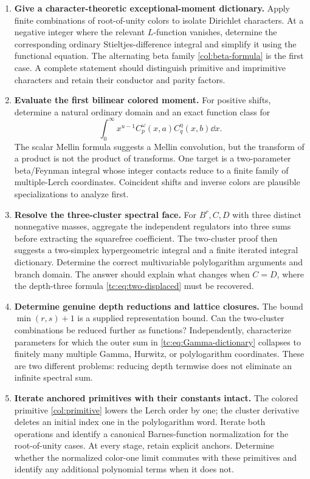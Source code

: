 \begin{enumerate}[label=\textbf{Q\arabic*.},leftmargin=*]
\item \textbf{Give a character-theoretic exceptional-moment dictionary.}
Apply finite combinations of root-of-unity colors to isolate
Dirichlet characters. At a negative integer where the relevant
$L$-function vanishes, determine the corresponding ordinary
Stieltjes-difference integral and simplify it using the
functional equation. The alternating beta family
\eqref{col:beta-formula} is the first case. A complete statement
should distinguish primitive and imprimitive characters and
retain their conductor and parity factors.

\item \textbf{Evaluate the first bilinear colored moment.}
For positive shifts, determine a natural ordinary domain and an
exact function class for
\[
 \int_0^\infty x^{u-1}
                  C_p^\omega(x,a)C_q^\eta(x,b)\dd x.
\]
The scalar Mellin formula suggests a Mellin convolution, but
the transform of a product is not the product of transforms.
One target is a two-parameter beta/Feynman integral whose
integer contacts reduce to a finite family of multiple-Lerch
coordinates. Coincident shifts and inverse colors are plausible
specializations to analyze first.

\item \textbf{Resolve the three-cluster spectral face.}
For $B^r,C,D$ with three distinct nonnegative masses, aggregate
the independent regulators into three sums before extracting
the squarefree coefficient. The two-cluster proof then suggests
a two-simplex hypergeometric integral and a finite iterated
integral dictionary. Determine the correct multivariable
polylogarithm arguments and branch domain. The answer should
explain what changes when $C=D$, where the depth-three formula
\eqref{tc:eq:two-displaced} must be recovered.

\item \textbf{Determine genuine depth reductions and lattice closures.}
The bound $\min(r,s)+1$ is a supplied representation bound.
Can the two-cluster combinations be reduced further as
functions? Independently, characterize parameters for which
the outer sum in \eqref{tc:eq:Gamma-dictionary} collapses to
finitely many multiple Gamma, Hurwitz, or polylogarithm
coordinates. These are two different problems: reducing
depth termwise does not eliminate an infinite spectral sum.

\item \textbf{Iterate anchored primitives with their constants intact.}
The colored primitive \eqref{col:primitive} lowers the Lerch
order by one; the cluster derivative deletes an initial index
one in the polylogarithm word. Iterate both operations and
identify a canonical Barnes-function normalization for the
root-of-unity cases. At every stage, retain explicit anchors.
Determine whether the normalized color-one limit commutes
with these primitives and identify any additional polynomial
terms when it does not.


\end{enumerate}

